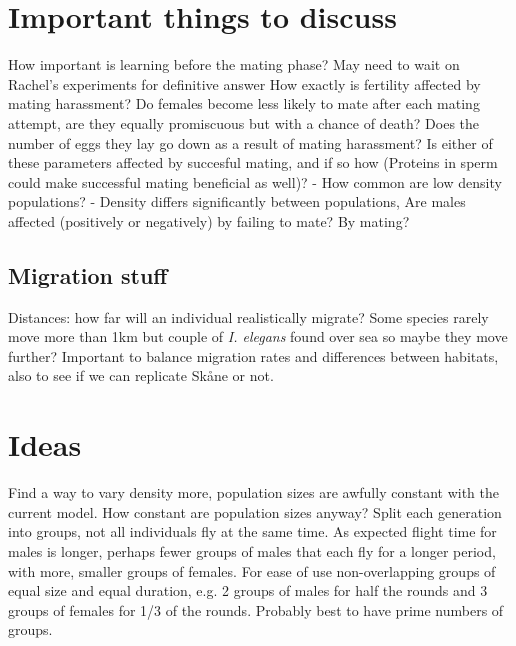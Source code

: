 \documentclass{article}
\begin{document}
\section{Important things to discuss}
How important is learning before the mating phase? May need to wait on Rachel's experiments for definitive answer
How exactly is fertility affected by mating harassment? Do females become less likely to mate after each mating attempt, are they equally promiscuous but with a chance of death? Does the number of eggs they lay go down as a result of mating harassment? Is either of these parameters affected by succesful mating, and if so how (Proteins in sperm could make successful mating beneficial as well)?
- How common are low density populations? - Density differs significantly between populations, \cite{anecdotal}
Are males affected (positively or negatively) by failing to mate? By mating?

\subsection{Migration stuff}
Distances: how far will an individual realistically migrate? Some species rarely move more than 1km but couple of \textit{I. elegans} found over sea so maybe they move further? Important to balance migration rates and differences between habitats, also to see if we can replicate Sk{\aa}ne or not.

\section{Ideas}
Find a way to vary density more, population sizes are awfully constant with the current model. How constant are population sizes anyway?
Split each generation into groups, not all individuals fly at the same time. As expected flight time for males is longer, perhaps fewer groups of males that each fly for a longer period, with more, smaller groups of females. For ease of use non-overlapping groups of equal size and equal duration, e.g. 2 groups of males for half the rounds and 3 groups of females for 1/3 of the rounds. Probably best to have prime numbers of groups.
\end{document}
